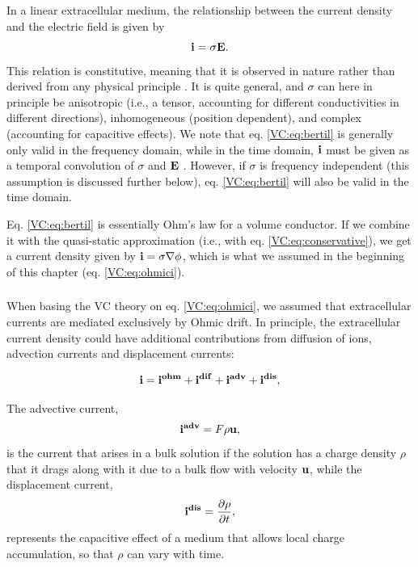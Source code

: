 \subsubsection{ }
\label{sec:LinEx}
In a linear extracellular medium, the relationship between the current density and the electric field is given by
\begin{equation}
{\bf i} = \sigma {\bf E}.
\label{VC:eq:bertil}
\end{equation}
This relation is constitutive, meaning that it is observed in nature rather than derived from any physical principle \citep{Nunez2006, Pettersen2012}. It is quite general, and $\sigma$ can here in principle be anisotropic (i.e., a tensor, accounting for different conductivities in different directions), inhomogeneous (position dependent), and complex (accounting for capacitive effects). We note that eq. \ref{VC:eq:bertil} is generally only valid in the frequency domain, while in the time domain, ${\bf i}$ must be given as a temporal convolution of $\sigma$ and ${\bf E}$ \cite{Bedard2009}. However, if $\sigma$ is frequency independent (this assumption is discussed further below), eq. \ref{VC:eq:bertil} will also be valid in the time domain.

Eq. \ref{VC:eq:bertil} is essentially Ohm's law for a volume conductor. If we combine it with the quasi-static approximation (i.e., with eq. \ref{VC:eq:conservative}), we get a current density given by ${\bf i} = \sigma \nabla \phi$, which is what we assumed in the beginning of this chapter (eq. \ref{VC:eq:ohmici}).


\subsubsection{}
\label{sec:onlyohmic}
When basing the VC theory on eq. \ref{VC:eq:ohmici}, we assumed that extracellular currents are mediated exclusively by Ohmic drift. In principle, the extracellular current density could have additional contributions from diffusion of ions, advection currents and displacement currents:

\begin{equation}
{\bf i} = {\bf i^{ohm}} + {\bf i^{dif}} + {\bf i^{adv}} + {\bf i^{dis}}, 
\label{VC:eq:generalcurrent}
\end{equation}

The advective current, 
\begin{equation}
{\bf i^{adv}} = F \rho {\bf u}, 
\label{VC:eq:iadv}
\end{equation}
is the current that arises in a bulk solution if the solution has a charge density $\rho$ that it drags along with it due to a bulk flow with velocity ${\bf u}$, while the displacement current,
\begin{equation}
{\bf i^{dis}} = \frac{\partial \rho}{\partial t},
\label{VC:eq:idis}
\end{equation}
represents the capacitive effect of a medium that allows local charge accumulation, so that $\rho$ can vary with time.  

